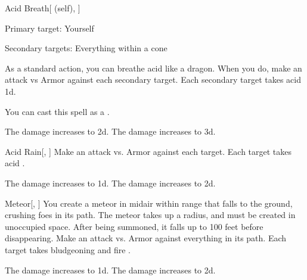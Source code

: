 \lowercase{\hypertarget{spell:Acid Breath}{}}\label{spell:Acid Breath}
\begin{attuneability}[Rank 4]{\hypertarget{spell:Acid Breath}{Acid Breath}}[ (self), ]

Primary target: Yourself
\par\noindent
Secondary targets: Everything within a \arealarge cone

As a standard action, you can breathe acid like a dragon.
When you do, make an attack vs Armor against each secondary target.
\hit Each secondary target takes acid  \plus1d.

You can cast this spell as a .

\rankline
{} The damage increases to  \plus2d.
 The damage increases to  \plus3d.
\end{attuneability}
\vspace{0.25em}



\lowercase{\hypertarget{spell:Acid Rain}{}}\label{spell:Acid Rain}
\begin{freeability}[Rank 4]{\hypertarget{spell:Acid Rain}{Acid Rain}}[, ]
Make an attack vs. Armor against each target.
\hit Each target takes acid .

\rankline
{} The damage increases to  \plus1d.
 The damage increases to  \plus2d.
\end{freeability}
\vspace{0.25em}



\lowercase{\hypertarget{spell:Meteor}{}}\label{spell:Meteor}
\begin{freeability}[Rank 4]{\hypertarget{spell:Meteor}{Meteor}}[, ]
You create a meteor in midair within \rngclose range that falls to the ground, crushing foes in its path.
The meteor takes up a \areasmall radius, and must be created in unoccupied space.
After being summoned, it falls up to 100 feet before disappearing.
Make an attack vs. Armor against everything in its path.
\hit Each target takes bludgeoning and fire .

\rankline
{} The damage increases to  \plus1d.
 The damage increases to  \plus2d.
\end{freeability}
\vspace{0.25em}



